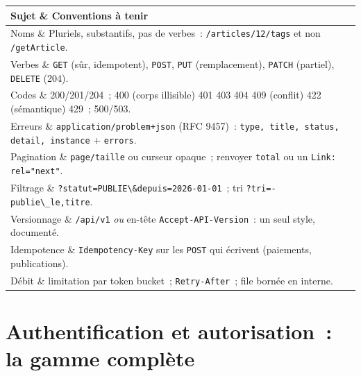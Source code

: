 \documentclass[12pt,a4paper,twoside,openright]{book}
\makeatletter
\newenvironment{tabz}[1]{\rowcolors{2}{white}{tralight}%
  \small\setlength{\tabcolsep}{5pt}\setlength{\LTpre}{3pt}\setlength{\LTpost}{3pt}%
  \begin{longtable}{@{}#1@{}}\toprule}
  {\bottomrule\end{longtable}\normalfont\setlength{\tabcolsep}{6pt}}
\newcommand{\thd}[1]{\textbf{\color{white}#1}}
\newcommand{\headrow}{\rowcolor{theadbg}}
\makeatother
\begin{document}
\begin{tabz}{p{}X}
  \headrow \thd{Sujet} \& \thd{Conventions \`a tenir} \\
  \midrule
  Noms \& Pluriels, substantifs, pas de verbes~: \verb|/articles/12/tags| et non \verb|/getArticle|. \\
  Verbes \& \verb|GET| (s\^ur, idempotent), \verb|POST|, \verb|PUT| (remplacement), \verb|PATCH| (partiel), \verb|DELETE| (204). \\
  Codes \& 200/201/204~; 400 (corps illisible) 401 403 404 409 (conflit) 422 (s\'emantique) 429~; 500/503. \\
  Erreurs \& \verb|application/problem+json| (RFC 9457)~: \verb|type, title, status, detail, instance| + \verb|errors|. \\
  Pagination \& \verb|page/taille| ou curseur opaque~; renvoyer \verb|total| ou un \verb|Link: rel="next"|. \\
  Filtrage \& \verb|?statut=PUBLIE\&depuis=2026-01-01|~; tri \verb|?tri=-publie\_le,titre|. \\
  Versionnage \& \verb|/api/v1| \emph{ou} en-t\^ete \verb|Accept-API-Version|~: un seul style, document\'e. \\
  Idempotence \& \verb|Idempotency-Key| sur les \verb|POST| qui \'ecrivent (paiements, publications). \\
  D\'ebit \& limitation par token bucket~; \verb|Retry-After|~; file born\'ee en interne. \\
\end{tabz}

\section{Authentification et autorisation~: la gamme compl\`ete}
\end{document}

